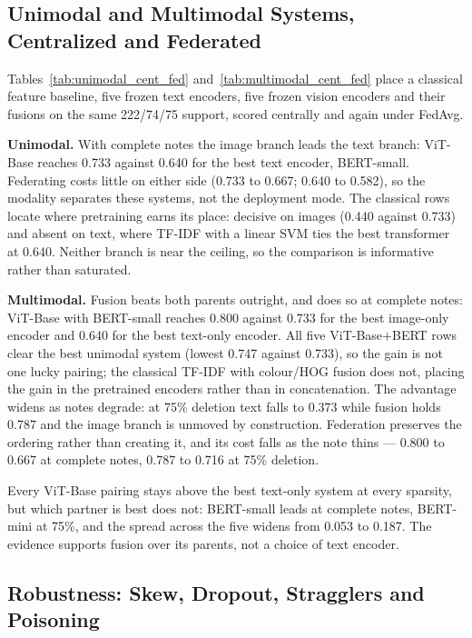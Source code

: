 \documentclass[conference]{IEEEtran}
\begin{document}
\subsection{Unimodal and Multimodal Systems, Centralized and Federated}




Tables~\ref{tab:unimodal_cent_fed} and~\ref{tab:multimodal_cent_fed} place a
classical feature baseline, five frozen text encoders, five frozen vision
encoders and their fusions on the same 222/74/75 support, scored centrally and
again under FedAvg.

\textbf{Unimodal.} With complete notes the image branch leads the text branch: ViT-Base reaches
0.733 against 0.640 for the best text encoder, BERT-small. Federating costs
little on either side (0.733 to 0.667; 0.640 to 0.582), so the modality
separates these systems, not the deployment mode. The classical rows locate
where pretraining earns its place: decisive on images (0.440 against 0.733) and
absent on text, where TF-IDF with a linear SVM ties the best transformer at
0.640. Neither branch is near the
ceiling, so the comparison is informative rather than saturated.

\textbf{Multimodal.} Fusion beats both parents outright, and does so at complete notes:
ViT-Base with BERT-small reaches 0.800 against 0.733 for the best image-only
encoder and 0.640 for the best text-only encoder. All five ViT-Base$+$BERT rows clear the best
unimodal system (lowest 0.747 against 0.733), so the gain is not one lucky
pairing; the classical TF-IDF with colour/HOG fusion does not,
placing the gain in the pretrained encoders rather than in concatenation. The
advantage widens as notes degrade: at 75\% deletion text falls to 0.373 while
fusion holds 0.787 and the image branch is unmoved by construction. Federation preserves
the ordering rather than creating it, and its cost falls as the note thins ---
0.800 to 0.667 at complete notes, 0.787 to 0.716 at 75\% deletion.

Every ViT-Base pairing stays above the best text-only system at every sparsity,
but which partner is best does not: BERT-small leads at complete notes,
BERT-mini at 75\%, and the spread across the five widens from 0.053 to 0.187.
The evidence supports fusion over its parents, not a choice of text encoder.

\subsection{Robustness: Skew, Dropout, Stragglers and Poisoning}
\label{sec:robustness}
\end{document}

